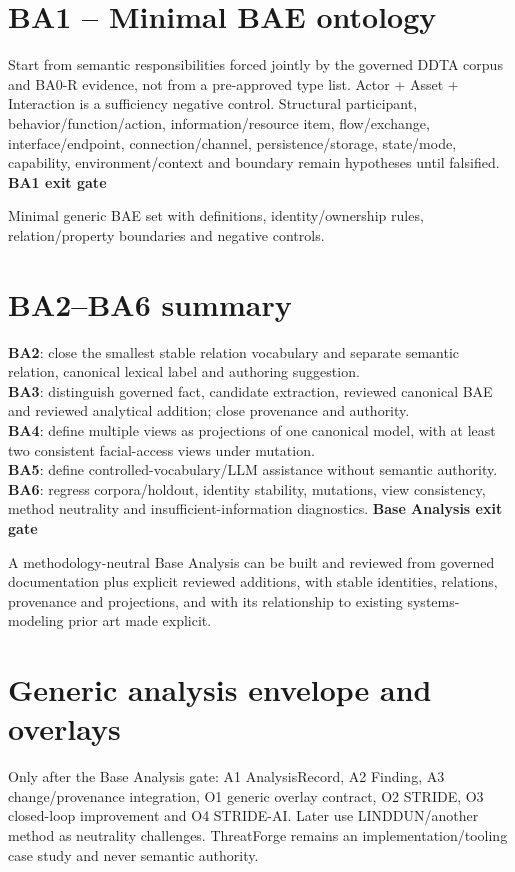 \documentclass[11pt,a4paper]{article}
\newenvironment{gate}[1]{\def\FrameCommand{\fcolorbox{ddtagreen}{ddtagray}}\MakeFramed{\advance\hsize-2\width\FrameRestore}\noindent\textbf{#1}\par\smallskip}{\endMakeFramed}
\begin{document}
\section{BA1 -- Minimal BAE ontology}
Start from semantic responsibilities forced jointly by the governed DDTA corpus and BA0-R evidence, not from a pre-approved type list. Actor + Asset + Interaction is a sufficiency negative control. Structural participant, behavior/function/action, information/resource item, flow/exchange, interface/endpoint, connection/channel, persistence/storage, state/mode, capability, environment/context and boundary remain hypotheses until falsified.
\begin{gate}{BA1 exit gate}Minimal generic BAE set with definitions, identity/ownership rules, relation/property boundaries and negative controls.\end{gate}

\section{BA2--BA6 summary}
\textbf{BA2}: close the smallest stable relation vocabulary and separate semantic relation, canonical lexical label and authoring suggestion.\\
\textbf{BA3}: distinguish governed fact, candidate extraction, reviewed canonical BAE and reviewed analytical addition; close provenance and authority.\\
\textbf{BA4}: define multiple views as projections of one canonical model, with at least two consistent facial-access views under mutation.\\
\textbf{BA5}: define controlled-vocabulary/LLM assistance without semantic authority.\\
\textbf{BA6}: regress corpora/holdout, identity stability, mutations, view consistency, method neutrality and insufficient-information diagnostics.
\begin{gate}{Base Analysis exit gate}
A methodology-neutral Base Analysis can be built and reviewed from governed documentation plus explicit reviewed additions, with stable identities, relations, provenance and projections, and with its relationship to existing systems-modeling prior art made explicit.
\end{gate}

\section{Generic analysis envelope and overlays}
Only after the Base Analysis gate: A1 AnalysisRecord, A2 Finding, A3 change/provenance integration, O1 generic overlay contract, O2 STRIDE, O3 closed-loop improvement and O4 STRIDE-AI. Later use LINDDUN/another method as neutrality challenges. ThreatForge remains an implementation/tooling case study and never semantic authority.
\end{document}
